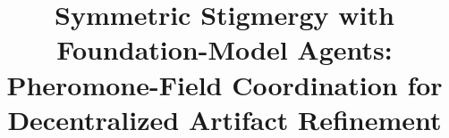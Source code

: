 




\title[Symmetric Stigmergy with Foundation-Model Agents]{Symmetric Stigmergy with Foundation-Model Agents: Pheromone-Field Coordination for Decentralized Artifact Refinement}

\author*[1]{ }


